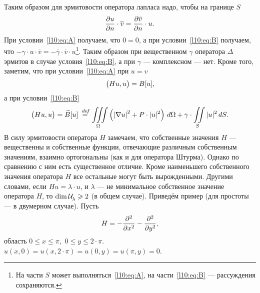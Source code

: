 Таким образом для эрмитовости оператора лапласа надо, чтобы на границе $S$
\begin{equation*}
	\hfill\pder{u}{n}\cdot\overline{v}=\pder{\overline{v}}{n}\cdot u.\hfill
\end{equation*}
При условии~\eqref{l10:eq:A} получаем, что $0=0$, а при условии~\eqref{l10:eq:B} получаем, что $-\gamma\cdot u\cdot\overline{v}=-\overline{\gamma}\cdot\overline{v}\cdot u$\footnote{На части $S$ может выполняться~\eqref{l10:eq:A}, на части~\eqref{l10:eq:B} --- рассуждения сохраняются.}. Таким образом при вещественном $\gamma$ оператора $\Delta$ эрмитов в случае условия~\eqref{l10:eq:B}, а при $\gamma$ --- комплексном --- нет. Кроме того, заметим, что при условии~\eqref{l10:eq:A} при $u=v$
\begin{equation}\label{l10:eq:7}
	\hfill\big(Hu,u\big)=B[u],\hfill
\end{equation} 
а при условии~\eqref{l10:eq:B}
\begin{equation}\label{l10:eq:8}
	\hfill\big(Hu,u\big)=\widetilde{B}[u]\eqdef\iiint\limits_{\Omega}\left(\left|\nabla u\right|^2+P\cdot|u|^2\right)\,d\Omega+\gamma\cdot\iint\limits_{S}|u|^2\,dS.\hfill
\end{equation}
В силу эрмитовости оператора $H$ замечаем, что собственные значения $H$ --- вещественны и собственные функции, отвечающие различным собственным значениям, взаимно ортогональны (как и для оператора Штурма). Однако по сравнению с ним есть существенное отличие. Кроме наименьшего собственного значения оператора $H$ все остальные могут быть вырожденными. Другими словами, если $Hu=\lambda\cdot u$, и $\lambda$ --- не минимальное собственное значение оператора $H$, то $\dim\mathcal{U}\!{\mathstrut}_{\lambda}\geqslant2$ (в общем случае). Приведём пример (для простоты --- в двумерном случае). Пусть
\begin{equation*}
	\hfill H=-\pdder{}{x}-\pdder{}{y},\hfill
\end{equation*}
область $0\leqslant x\leqslant\pi$,\ $0\leqslant y\leqslant 2\cdot\pi$. $u(x,0)=u(x,2\cdot\pi)=u(0,y)=u(\pi,y)=0$.



